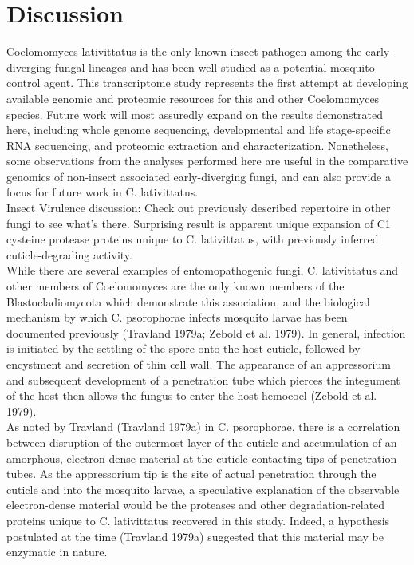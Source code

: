 \section{Discussion}
Coelomomyces lativittatus is the only known insect pathogen among the early-diverging fungal lineages and has been well-studied as a potential mosquito control agent. This transcriptome study represents the first attempt at developing available genomic and proteomic resources for this and other Coelomomyces species. Future work will most assuredly expand on the results demonstrated here, including whole genome sequencing, developmental and life stage-specific RNA sequencing, and proteomic extraction and characterization. Nonetheless, some observations from the analyses performed here are useful in the comparative genomics of non-insect associated early-diverging fungi, and can also provide a focus for future work in C. lativittatus. \\
\indent Insect Virulence discussion: Check out previously described repertoire in other fungi to see what’s there. Surprising result is apparent unique expansion of C1 cysteine protease proteins unique to C. lativittatus, with previously inferred cuticle-degrading activity. \\
\indent While there are several examples of entomopathogenic fungi, C. lativittatus and other members of Coelomomyces are the only known members of the Blastocladiomycota which demonstrate this association, and the biological mechanism by which C. psorophorae infects mosquito larvae has been documented previously (Travland 1979a; Zebold et al. 1979). In general, infection is initiated by the settling of the spore onto the host cuticle, followed by encystment and secretion of thin cell wall. The appearance of an appressorium and subsequent development of a penetration tube which pierces the integument of the host then allows the fungus to enter the host hemocoel (Zebold et al. 1979). \\
\indent As noted by Travland (Travland 1979a) in C. psorophorae, there is a correlation between disruption of the outermost layer of the cuticle and accumulation of an amorphous, electron-dense material at the cuticle-contacting tips of penetration tubes. As the appressorium tip is the site of actual penetration through the cuticle and into the mosquito larvae, a speculative explanation of the observable electron-dense material would be the proteases and other degradation-related proteins unique to C. lativittatus recovered in this study. Indeed, a hypothesis postulated at the time (Travland 1979a) suggested that this material may be enzymatic in nature. \\
